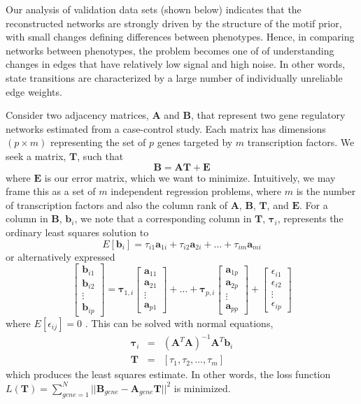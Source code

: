 Our analysis of validation data sets (shown below) indicates that the reconstructed networks are strongly driven by the structure of the motif prior, with small changes defining differences between phenotypes. Hence, in comparing networks between phenotypes, the problem becomes one of of understanding changes in edges that have relatively low signal and high noise. In other words, state transitions are characterized by a large number of individually unreliable edge weights.

Consider two adjacency matrices, $\mathbf{A}$ and $\mathbf{B}$, that represent two gene regulatory networks estimated from a case-control study. Each matrix has dimensions $\left(p\times m\right)$ representing the set of $p$ genes targeted by $m$ transcription factors. We seek a matrix, $\mathbf{T}$, such that 
\[
\mathbf{B}=\mathbf{AT}+\mathbf{E}
\]
where $\mathbf{E}$ is our error matrix, which we want to minimize. Intuitively, we may frame this as a set of $m$ independent regression problems, where $m$ is the number of transcription factors and also the column rank of $\mathbf{A}$, $\mathbf{B}$, $\mathbf{T}$, and $\mathbf{E}$. For a column in $\mathbf{B}$, $\mathbf{b}_{i}$, we note that a corresponding column in $\mathbf{T}$, $\mathbf{\tau}_{i}$, represents the ordinary least squares solution to
\[
E\left[\mathbf{b}_{i}\right]=\tau_{i1}\mathbf{a}_{1i}+\tau_{i2}\mathbf{a}_{2i}+\dots+\tau_{im}\mathbf{a}_{mi}
\]
or alternatively expressed 
\[
\left[\begin{array}{c}
\mathbf{b}_{i1}\\
\mathbf{b}_{i2}\\
\vdots\\
\mathbf{b}_{ip}
\end{array}\right]=\mathbf{\tau}_{1,i}\left[\begin{array}{c}
\mathbf{a}_{11}\\
\mathbf{a}_{21}\\
\vdots\\
\mathbf{a}_{p1}
\end{array}\right]+\dots+\mathbf{\tau}_{p,i}\left[\begin{array}{c}
\mathbf{a}_{1p}\\
\mathbf{a}_{2p}\\
\vdots\\
\mathbf{a}_{pp}
\end{array}\right]+\left[\begin{array}{c}
\epsilon_{i1}\\
\epsilon_{i2}\\
\vdots\\
\epsilon_{ip}
\end{array}\right]
\]
where $E\left[\epsilon_{ij}\right]=0$ . This can be solved with normal equations, 
\begin{eqnarray*}
\mathbf{\tau}_{i} & = & \left(\mathbf{A}^{T}\mathbf{A}\right)^{-1}\mathbf{A}^{T}\mathbf{b}_{i}\\
\mathbf{T} & = & \left[\tau_{1},\tau_{2},\dots,\tau_{m}\right]
\end{eqnarray*}
which produces the least squares estimate. In other words, the loss function $L\left(\mathbf{T}\right)=\sum_{gene=1}^{N}||\mathbf{B}_{gene}-\mathbf{A}_{gene}\mathbf{T}||^{2}$ is minimized. 

